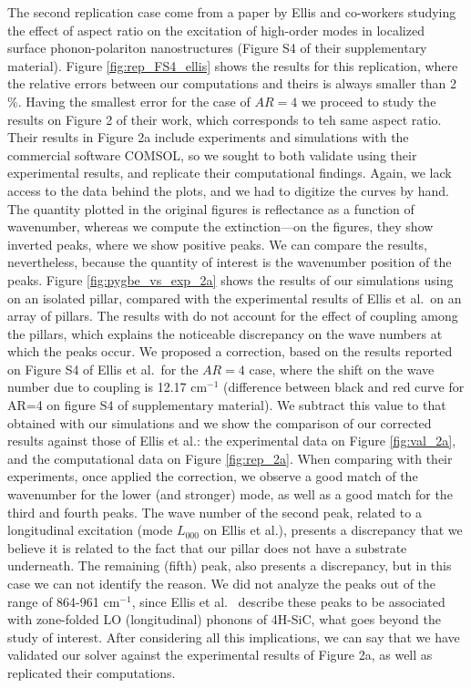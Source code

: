 The second replication case come from a paper by Ellis and co-workers \cite{ellis2016} studying the effect of aspect ratio on the excitation of high-order modes in localized surface phonon-polariton nanostructures (Figure S4 of their supplementary material).
Figure \ref{fig:rep_FS4_ellis} shows the results for this replication, where the relative errors between our computations and theirs is always smaller than 2$\%$. Having the smallest error for the case of $AR=4$ we proceed to study the results on Figure 2 of their work, which corresponds to teh same aspect ratio.
Their results in Figure 2a include experiments and simulations with the commercial software COMSOL, so we sought to both validate \pygbe using their experimental results, and replicate their computational findings. 
Again, we lack access to the data behind the plots, and we had to digitize the curves by hand. 
The quantity plotted in the original figures is reflectance as a function of wavenumber, whereas we compute the extinction---on the figures, they show inverted peaks, where we show positive peaks.
We can compare the results, nevertheless, because the quantity of interest is the wavenumber position of the peaks.
Figure \ref{fig:pygbe_vs_exp_2a} shows the results of our simulations using \pygbe on an isolated pillar,
compared with the experimental results of Ellis et al.\ on an array of pillars.
The results with \pygbe  do not account for the effect of coupling among the pillars, which explains the noticeable discrepancy on the wave numbers at which the peaks occur. 
We proposed a correction, based on the results reported on Figure S4 of Ellis et al.\ for the $AR=4$ case, where the shift on the wave number due to coupling is 12.17 cm$^{-1}$ (difference between black and red curve for AR=4 on figure S4 of supplementary material). 
We subtract this value to that obtained with our simulations and we show the comparison of our corrected results against those of Ellis et al.: the experimental data on Figure \ref{fig:val_2a}, and the
computational data on Figure \ref{fig:rep_2a}. 
When comparing with their experiments, once applied the correction, we observe a good match of the wavenumber for the lower (and stronger) mode, as well as a good match for the 
third and fourth peaks. The wave number of the second peak, related to a longitudinal excitation (mode $L_{000}$ on Ellis et al.), presents a discrepancy that we believe it is related to the fact that our 
pillar does not have a substrate underneath. The remaining (fifth) peak, also presents a discrepancy, but in this case we can not identify the reason.
We did not analyze the peaks out of the range of 864-961 cm$^{-1}$, since Ellis et al. \ describe these peaks to be associated with zone-folded LO (longitudinal) phonons of 4H-SiC,
what goes beyond the study of interest.
After considering all this implications, we can say that we have validated our solver \pygbe against the experimental results of Figure 2a, as well as replicated their computations. 


